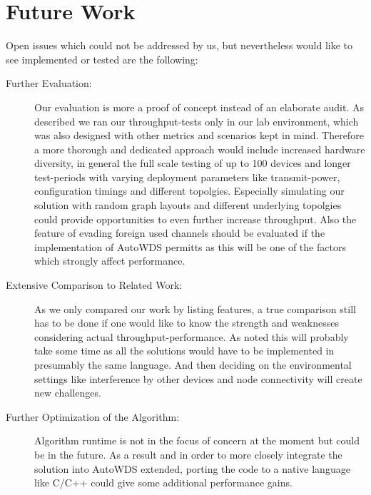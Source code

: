   \section{Future Work}
    Open issues which could not be addressed by us, but nevertheless would like 
    to see implemented or tested are the following:
    \begin{description}
      \item [Further Evaluation:]
	Our evaluation is more a proof of concept instead of an elaborate audit. As described we ran our throughput-tests only in our lab environment, 
	which was also designed with other metrics and scenarios kept in mind. Therefore a more thorough and dedicated approach would include increased hardware diversity, 
	in general the full scale testing of up to 100 devices and longer test-periods with varying deployment parameters like transmit-power, 
	configuration timings and different topolgies.
	Especially simulating our solution with random graph layouts and different underlying topolgies could provide opportunities to even further increase throughput.
	Also the feature of evading foreign used channels should be evaluated if the implementation of 
	AutoWDS permitts as this will be one of the factors which strongly affect performance.
      
      \item[Extensive Comparison to Related Work:]
	As we only compared our work by listing features, a true comparison still has to be done if one would 
	like to know the strength and weaknesses considering actual throughput-performance.
	As noted this will probably take some time as all the solutions would have to be 
	implemented in presumably the same language. And then deciding on the environmental settings
	like interference by other devices and node connectivity will create new challenges.
      
      \item[Further Optimization of the Algorithm:]
	Algorithm runtime is not in the focus of concern at the moment but could be in the future. 
	As a result and in order to more closely integrate the solution into AutoWDS extended,
	porting the code to a native language like C/C++ could give some additional performance gains.
      

\end{description}

